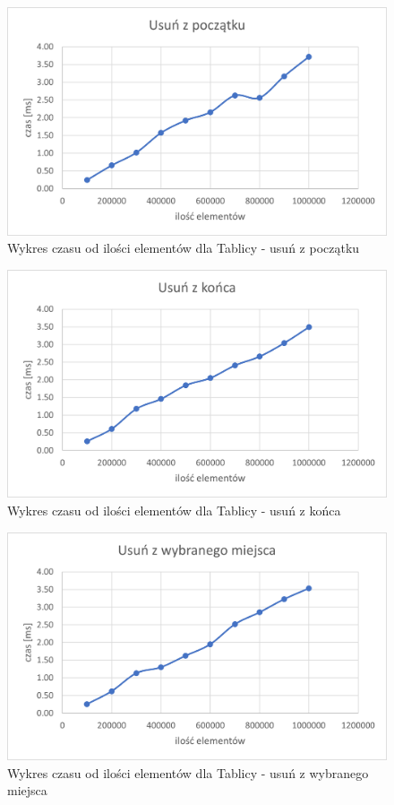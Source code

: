 \documentclass{article}
\begin{document}
    \begin{figure}[H]
        \centering
        \includegraphics[scale = 0.85]{wykresy/arr/removeFirst.png}
        \caption{Wykres czasu od ilości elementów dla Tablicy - usuń z początku}
    \end{figure}

    
    \begin{figure}[H]
        \centering
        \includegraphics[scale = 0.85]{wykresy/arr/removeLast.png}
        \caption{Wykres czasu od ilości elementów dla Tablicy - usuń z końca}
    \end{figure}
    
    \begin{figure}[H]
        \centering
        \includegraphics[scale = 0.85]{wykresy/arr/removeIndex.png}
        \caption{Wykres czasu od ilości elementów dla Tablicy - usuń z wybranego miejsca}
    \end{figure}
    
\end{document}
